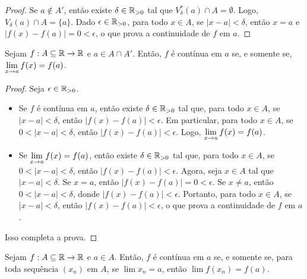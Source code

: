 \begin{proof}
    Se $a \notin A'$, então existe $\delta \in \mathbb{R}_{>0}$ tal que $V^*_{\delta}(a) \cap A = \emptyset$. Logo, $V_{\delta}(a) \cap A = \{a\}$. Dado $\epsilon \in \mathbb{R}_{>0}$, para todo $x \in A$, se $|x-a| < \delta$, então $x=a$ e $|f(x) - f(a)| = 0 < \epsilon$, o que prova a continuidade de $f$ em $a$. \blackproof
\end{proof}

\begin{theorem} \label{teo.calc1:continuidade_sse_limite}
    Sejam $f : A \subseteq \mathbb{R} \to \mathbb{R}$ e $a \in A \cap A'$. Então, $f$ é contínua em $a$ se, e somente se, $\displaystyle \lim_{x \to a} f(x) = f(a)$.
\end{theorem}

\begin{proof}
    Seja $\epsilon \in \mathbb{R}_{>0}$.
        \begin{itemize}[leftmargin=*, style=nextline]
            \item[($\Rightarrow$)] Se $f$ é contínua em $a$, então existe $\delta \in \mathbb{R}_{>0}$ tal que, para todo $x \in A$, se $|x-a|<\delta$, então $|f(x) - f(a)| < \epsilon$. Em particular, para todo $x \in A$, se $0<|x-a|<\delta$, então $|f(x) - f(a)| < \epsilon$. Logo, $\displaystyle \lim_{x \to a} f(x) = f(a)$.
            \item[($\Leftarrow$)] Se $\displaystyle \lim_{x \to a} f(x) = f(a)$, então existe $\delta \in \mathbb{R}_{>0}$ tal que, para todo $x \in A$, se $0<|x-a|<\delta$, então $|f(x) - f(a)| < \epsilon$. Agora, seja $x \in A$ tal que $|x-a|<\delta$. Se $x=a$, então $|f(x) - f(a)| = 0 < \epsilon$. Se $x \neq a$, então $0<|x-a|<\delta$, donde $|f(x) - f(a)| < \epsilon$. Portanto, para todo $x \in A$, se $|x-a|<\delta$, então $|f(x) - f(a)| < \epsilon$, o que prova a continuidade de $f$ em $a$.
        \end{itemize}
    Isso completa a prova. \blackproof
\end{proof}

\begin{theorem} \label{teo.calc1:continuidade_sequencial}
    Sejam $f : A \subseteq \mathbb{R} \to \mathbb{R}$ e $a \in A$. Então, $f$ é contínua em $a$ se, e somente se, para toda sequência $(x_n)$ em $A$, se $\lim x_n = a$, então $\lim f(x_n) = f(a)$.
\end{theorem}

